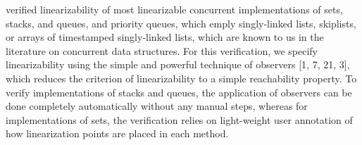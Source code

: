 verified linearizability of most linearizable concurrent implementations of sets, stacks,
and queues, and priority queues, which emply singly-linked lists, skiplists, or arrays
of timestamped singly-linked lists, which are known to us in the literature on concurrent data structures. For this verification, we specify linearizability using the simple and
powerful technique of observers [1, 7, 21, 3], which reduces the criterion of linearizability to a simple reachability property. To verify implementations of stacks and queues,
the application of observers can be done completely automatically without any manual
steps, whereas for implementations of sets, the verification relies on light-weight user
annotation of how linearization points are placed in each method. 
%
%
%
%
%
